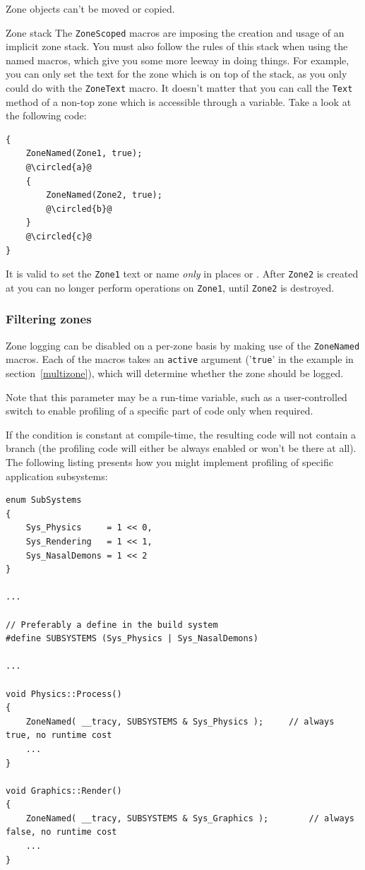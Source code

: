 \documentclass[hidelinks,titlepage,a4paper]{article}
\newcommand*\circled[1]{\tikz[baseline=(char.base)]{
    \node[shape=circle,draw,inner sep=1.5pt] (char) {#1};}}
\begin{document}
Zone objects can't be moved or copied.

\begin{bclogo}[
noborder=true,
couleur=black!5,
logo=\bcattention
]{Zone stack}
The \texttt{ZoneScoped} macros are imposing the creation and usage of an implicit zone stack. You must also follow the rules of this stack when using the named macros, which give you some more leeway in doing things. For example, you can only set the text for the zone which is on top of the stack, as you only could do with the \texttt{ZoneText} macro. It doesn't matter that you can call the \texttt{Text} method of a non-top zone which is accessible through a variable. Take a look at the following code:

\begin{lstlisting}
{
	ZoneNamed(Zone1, true);
	@\circled{a}@
	{
		ZoneNamed(Zone2, true);
		@\circled{b}@
	}
	@\circled{c}@
}
\end{lstlisting}

It is valid to set the \texttt{Zone1} text or name \emph{only} in places \circled{a} or \circled{c}. After \texttt{Zone2} is created at \circled{b} you can no longer perform operations on \texttt{Zone1}, until \texttt{Zone2} is destroyed.
\end{bclogo}

\subsubsection{Filtering zones}
\label{filteringzones}

Zone logging can be disabled on a per-zone basis by making use of the \texttt{ZoneNamed} macros. Each of the macros takes an \texttt{active} argument ('\texttt{true}' in the example in section~\ref{multizone}), which will determine whether the zone should be logged.

Note that this parameter may be a run-time variable, such as a user-controlled switch to enable profiling of a specific part of code only when required.

If the condition is constant at compile-time, the resulting code will not contain a branch (the profiling code will either be always enabled or won't be there at all). The following listing presents how you might implement profiling of specific application subsystems:

\begin{lstlisting}
enum SubSystems
{
	Sys_Physics		= 1 << 0,
	Sys_Rendering	= 1 << 1,
	Sys_NasalDemons	= 1 << 2
}

...

// Preferably a define in the build system
#define SUBSYSTEMS (Sys_Physics | Sys_NasalDemons)

...

void Physics::Process()
{
	ZoneNamed( __tracy, SUBSYSTEMS & Sys_Physics );		// always true, no runtime cost
	...
}

void Graphics::Render()
{
	ZoneNamed( __tracy, SUBSYSTEMS & Sys_Graphics );		// always false, no runtime cost
	...
}
\end{lstlisting}
\end{document}
